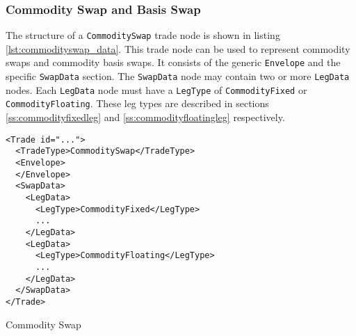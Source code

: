 \subsubsection{Commodity Swap and Basis Swap}
\label{ss:input_commodityswap}

The structure of a \lstinline!CommoditySwap! trade node is shown in listing \ref{lst:commodityswap_data}. This trade node can be used to represent commodity swaps and commodity basis swaps. It consists of the generic \lstinline!Envelope! and the specific \lstinline!SwapData! section. The \lstinline!SwapData! node may contain two or more \lstinline!LegData! nodes. Each \lstinline!LegData! node must have a \lstinline!LegType! of \lstinline!CommodityFixed! or \lstinline!CommodityFloating!. These leg types are described in sections \ref{ss:commodityfixedleg} and \ref{ss:commodityfloatingleg} respectively.

\begin{listing}[h!]
\begin{verbatim}
<Trade id="...">
  <TradeType>CommoditySwap</TradeType>
  <Envelope>
  </Envelope>
  <SwapData>
    <LegData>
      <LegType>CommodityFixed</LegType>
      ...
    </LegData>
    <LegData>
      <LegType>CommodityFloating</LegType>
      ...
    </LegData>
  </SwapData>
</Trade>
\end{verbatim}
\caption{Commodity Swap}
\label{lst:commodityswap_data}
\end{listing}

